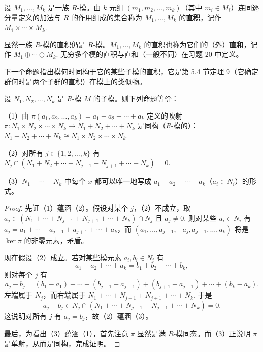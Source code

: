 \begin{definition}
设 \(M_1, \ldots, M_k\) 是一族 \(R\)-模。由 \(k\) 元组 \((m_1, m_2, \ldots, m_k)\)（其中 \(m_i \in M_i\)）连同逐分量定义的加法与 \(R\) 的作用组成的集合称为 \(M_1, \ldots, M_k\) 的\textbf{直积}，记作 \(M_1 \times \cdots \times M_k\).
\end{definition}

显然一族 \(R\)-模的直积仍是 \(R\)-模。\(M_1, \ldots, M_k\) 的直积也称为它们的（外）\textbf{直和}，记作 \(M_1 \oplus \cdots \oplus M_k\). 无穷多个模的直积与直和（一般不同）在习题 20 中定义。

下一个命题指出模何时同构于它的某些子模的直积，它是第 5.4 节定理 9（它确定群何时是两个子群的直积）在模上的类似物。

\begin{proposition}\label{pro:10.5}
设 \(N_1, N_2, \ldots, N_k\) 是 \(R\)-模 \(M\) 的子模。则下列命题等价：

（1）由 \(\pi(a_1, a_2, \ldots, a_k) = a_1+a_2+\cdots+a_k\) 定义的映射 \(\pi : N_1 \times N_2 \times \cdots \times N_k \to N_1+N_2+\cdots+N_k\) 是同构（\(R\)-模的）：\(N_1+N_2+\cdots+N_k \cong N_1 \times N_2 \times \cdots \times N_k\).

（2）对所有 \(j \in \{1, 2, \ldots, k\}\) 有 \(N_j \cap (N_1+N_2+\cdots+N_{j-1}+N_{j+1}+\cdots+N_k) = 0\).

（3）\(N_1+\cdots+N_k\) 中每个 \(x\) 都可以唯一地写成 \(a_1+a_2+\cdots+a_k\)（\(a_i \in N_i\)）的形式。
\end{proposition}

\begin{proof}
先证（1）蕴涵（2）。假设对某个 \(j\)，（2）不成立，取 \(a_j \in (N_1+\cdots+N_{j-1}+N_{j+1}+\cdots+N_k) \cap N_j\) 且 \(a_j \neq 0\). 则对某些 \(a_i \in N_i\) 有 \(a_j = a_1+\cdots+a_{j-1}+a_{j+1}+\cdots+a_k\)，而 \((a_1, \ldots, a_{j-1}, -a_j, a_{j+1}, \ldots, a_k)\) 将是 \(\ker\pi\) 的非零元素，矛盾。

现在假设（2）成立。若对某些模元素 \(a_i, b_i \in N_i\) 有
\[
a_1+a_2+\cdots+a_k = b_1+b_2+\cdots+b_k,
\]
则对每个 \(j\) 有
\[
a_j-b_j = (b_1-a_1)+\cdots+(b_{j-1}-a_{j-1})+(b_{j+1}-a_{j+1})+\cdots+(b_k-a_k).
\]
左端属于 \(N_j\)，而右端属于 \(N_1+\cdots+N_{j-1}+N_{j+1}+\cdots+N_k\). 于是
\[
a_j-b_j \in N_j \cap (N_1+\cdots+N_{j-1}+N_{j+1}+\cdots+N_k) = 0.
\]
这说明对所有 \(j\) 有 \(a_j = b_j\)，故（2）蕴涵（3）。

最后，为看出（3）蕴涵（1），首先注意 \(\pi\) 显然是满 \(R\)-模同态。而（3）正说明 \(\pi\) 是单射，从而是同构，完成证明。
\end{proof}

